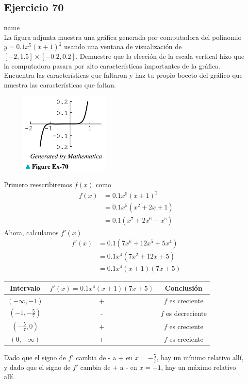 \documentclass[12pt]{article}
\begin{document}
\subsection{Ejercicio 70} name \\

La figura adjunta muestra una gráfica generada por computadora del polinomio $y = 0.1x^5 (x + 1)^2$ usando una ventana de visualización de $[−2, 1.5] \times [−0.2, 0.2]$. Demuestre que la elección de la escala vertical hizo que la computadora pasara por alto características importantes de la gráfica. Encuentra las características que faltaron y haz tu propio boceto del gráfico que muestra las características que faltan.
\begin{figure}[H]
\centering
\includegraphics[width=0.4\textwidth]{../img/img_Lista3/2_70.png}
\end{figure}
Primero reescribiremos $f(x)$ como
\begin{align*}
  f(x)
  &=0.1x^5 (x + 1)^2 \\
  &= 0.1x^5(x^2+2x+1)\\
  &= 0.1(x^7+2x^6+x^5)
\end{align*}
Ahora, calculamos $f'(x)$
\begin{align*}
  f'(x)
  &= 0.1(7x^6+12x^5+5x^4)\\
  &= 0.1x^4(7x^2+12x+5)\\
  &=0.1x^4(x+1)(7x+5)
\end{align*}

\begin{table}[H]
  \centering
  \begin{tabular}{c|c|c}
    \hline
    Intervalo & $f'(x) = 0.1x^4(x+1)(7x+5)$ & Conclusión \\
    \hline
    $(-\infty,-1)$ & + & $f$ es creciente \\
    $(-1,-\frac{5}{7})$ & - & $f$ es decreciente \\
    $(-\frac{5}{7},0)$ & + & $f$ es creciente\\
    $(0,+\infty)$ & + & $f$ es creciente\\
    \hline
  \end{tabular}
\end{table}
Dado que el signo de $f'$ cambia de - a + en $x=-\frac{5}{7}$, hay un mínimo relativo allí, y
dado que el signo de $f'$ cambia de + a - en $x=-1$, hay un máximo relativo allí.
\end{document}
